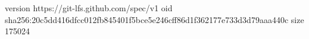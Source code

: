 version https://git-lfs.github.com/spec/v1
oid sha256:20c5dd416dfcc012fb845401f5bce5e246cff86d1f362177e733d3d79aaa440c
size 175024
